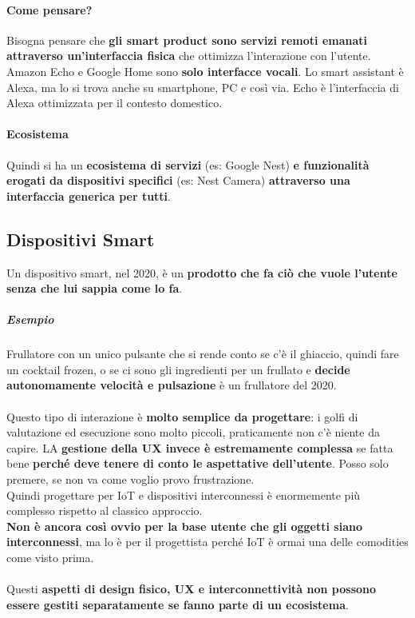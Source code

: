 \documentclass[10pt]{article}
\begin{document}
\paragraph{Come pensare?} Bisogna pensare che \textbf{gli smart product sono servizi remoti emanati attraverso un'interfaccia fisica} che ottimizza l'interazione con l'utente.\\
Amazon Echo e Google Home sono \textbf{solo interfacce vocali}. Lo smart assistant è Alexa, ma lo si trova anche su smartphone, PC e così via. Echo è l'interfaccia di Alexa ottimizzata per il contesto domestico.
\paragraph{Ecosistema} Quindi si ha un \textbf{ecosistema di servizi} (es: Google Nest) \textbf{e funzionalità erogati da dispositivi specifici} (es: Nest Camera) \textbf{attraverso una interfaccia generica per tutti}.
\subsection{Dispositivi Smart}
Un dispositivo smart, nel 2020, è un \textbf{prodotto che fa ciò che vuole l'utente senza che lui sappia come lo fa}.
\subparagraph{Esempio} Frullatore con un unico pulsante che si rende conto se c'è il ghiaccio, quindi fare un cocktail frozen, o se ci sono gli ingredienti per un frullato e \textbf{decide autonomamente velocità e pulsazione} è un frullatore del 2020.\\\\
Questo tipo di interazione è \textbf{molto semplice da progettare}: i golfi di valutazione ed esecuzione sono molto piccoli, praticamente non c'è niente da capire. LA \textbf{gestione della UX invece è estremamente complessa} se fatta bene \textbf{perché deve tenere di conto le aspettative dell'utente}. Posso solo premere, se non va come voglio provo frustrazione.\\
Quindi progettare per IoT e dispositivi interconnessi è enormemente più complesso rispetto al classico approccio.\\
\textbf{Non è ancora così ovvio per la base utente che gli oggetti siano interconnessi}, ma lo è per il progettista perché IoT è ormai una delle comodities come visto prima.\\\\
Questi \textbf{aspetti di design fisico, UX e interconnettività non possono essere gestiti separatamente se fanno parte di un ecosistema}.
\end{document}
